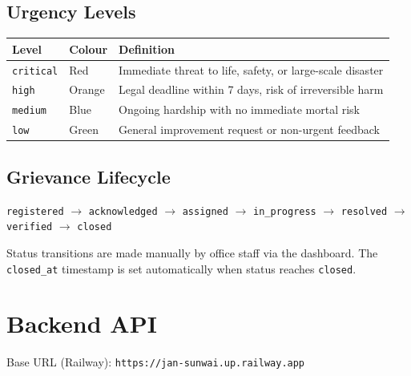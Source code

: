 \documentclass[11pt, a4paper]{article}
\begin{document}
\subsection{Urgency Levels}

\begin{tabularx}{\linewidth}{llX}
\toprule
\textbf{Level} & \textbf{Colour} & \textbf{Definition} \\
\midrule
\textcolor{criticalred}{\texttt{critical}} & Red    & Immediate threat to life, safety, or large-scale disaster \\
\textcolor{highorg}{\texttt{high}}         & Orange & Legal deadline within 7 days, risk of irreversible harm \\
\textcolor{mediumblu}{\texttt{medium}}     & Blue   & Ongoing hardship with no immediate mortal risk \\
\textcolor{lowgreen}{\texttt{low}}         & Green  & General improvement request or non-urgent feedback \\
\bottomrule
\end{tabularx}

\subsection{Grievance Lifecycle}

\begin{center}
\begin{tcolorbox}[colback=lightgray, colframe=pollityblue, sharp corners]
\footnotesize\ttfamily
\texttt{registered} $\to$ \texttt{acknowledged} $\to$ \texttt{assigned} $\to$ \texttt{in\_progress} $\to$ \texttt{resolved} $\to$ \texttt{verified} $\to$ \texttt{closed}
\end{tcolorbox}
\end{center}

Status transitions are made manually by office staff via the dashboard. The \texttt{closed\_at} timestamp is set automatically when status reaches \texttt{closed}.

\newpage

\section{Backend API}

Base URL (Railway): \texttt{https://jan-sunwai.up.railway.app}
\end{document}
